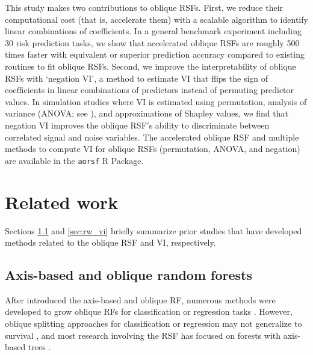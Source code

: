 \documentclass[twoside,11pt]{article}\usepackage[]{graphicx}\usepackage[]{xcolor}
\newcommand{\ie}{that is}
\newcommand{\eg}{for example}
\begin{document}
This study makes two contributions to oblique RSFs. First, we reduce their computational cost (\ie, accelerate them) with a scalable algorithm to identify linear combinations of coefficients. In a general benchmark experiment including 30 risk prediction tasks, we show that accelerated oblique RSFs are roughly 500 times faster with equivalent or superior prediction accuracy compared to existing routines to fit oblique RSFs. Second, we improve the interpretability of oblique RSFs with `negation VI', a method to estimate VI that flips the sign of coefficients in linear combinations of predictors instead of permuting predictor values. In simulation studies where VI is estimated using permutation, analysis of variance (ANOVA; see \citet{menze2011oblique}), and approximations of Shapley values, we find that negation VI improves the oblique RSF's ability to discriminate between correlated signal and noise variables. The accelerated oblique RSF and multiple methods to compute VI for oblique RSFs (permutation, ANOVA, and negation) are available in the \texttt{aorsf} R Package.






\section{Related work}

Sections \ref{sec:rw_forests} and \ref{sec:rw_vi} briefly summarize prior studies that have developed methods related to the oblique RSF and VI, respectively.

\subsection{Axis-based and oblique random forests} \label{sec:rw_forests}

After \citet{breiman2001random} introduced the axis-based and oblique RF, numerous methods were developed to grow oblique RFs for classification or regression tasks \citep{menze2011oblique, zhang2014oblique, rainforth2015canonical, zhu2015reinforcement, poona2016investigating, qiu2017oblique, tomita2020sparse, katuwal2020heterogeneous}. However, oblique splitting approaches for classification or regression may not generalize to survival \citep[\eg, see][Section~4.5.1]{zhu2013tree}, and most research involving the RSF has focused on forests with axis-based trees \citep{wang2017selective}.
\end{document}
